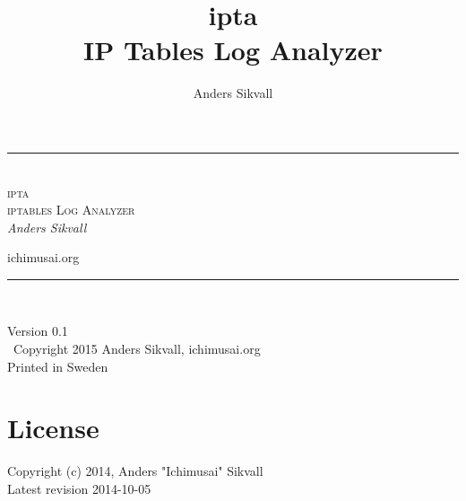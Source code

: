\documentclass[english,twoside,openright,a4paper,12pt]{article}
\author{Anders Sikvall}
\title{
	\Huge ipta\\[2em]
	IP Tables Log Analyzer}
\newcommand{\titlerule}{\rule{\linewidth}{1pt}}
\begin{document}
\begin{titlepage}
	\thispagestyle{empty}
	\begin{center}
	\end{center}
	\begin{center}
		\titlerule\\[3mm]
		\Huge \textsc{ipta\\\Large iptables Log Analyzer}\\[5mm]
		\large \emph{Anders Sikvall}\\
		\begin{center}
			\normalsize ichimusai.org\\

		\end{center}
		\titlerule\\
	\end{center}
\end{titlepage}

\null\vfill\thispagestyle{empty}
\noindent

\begin{center}
	Version 0.1\\[5mm] \textcopyright\ Copyright 2015 Anders Sikvall, 
	ichimusai.org\\
	Printed in Sweden
	\newpage
\end{center}

\cleardoublepage

\tableofcontents

\setlength{\parindent}{0pt}
\setlength{\parskip}{1em}

\lhead{\nouppercase{\leftmark}}
\rhead{\nouppercase{\rightmark}}

\pagestyle{fancy}


\newpage
\section*{License}
\label{license}

Copyright (c) 2014, Anders "Ichimusai" Sikvall\\
Latest revision 2014-10-05
 
\end{document}
